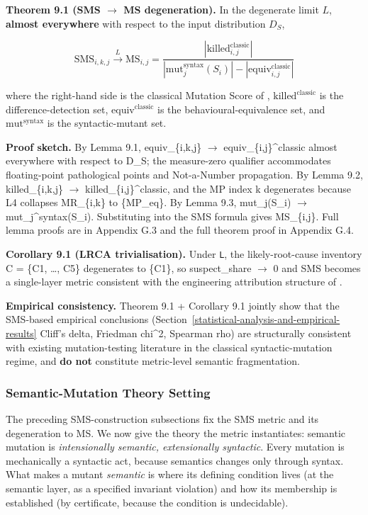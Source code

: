 \documentclass[12pt]{article}
\begin{document}
\textbf{Theorem 9.1 (SMS $\to$ MS degeneration).} In the degenerate limit
$L$, \textbf{almost everywhere} with respect to the input
distribution $D_S$,

\[ \mathrm{SMS}_{i,k,j} \xrightarrow{L} \mathrm{MS}_{i,j} = \frac{|\mathrm{killed}_{i,j}^{\mathrm{classic}}|}{|\mathrm{mut}_j^{\mathrm{syntax}}(S_i)| - |\mathrm{equiv}_{i,j}^{\mathrm{classic}}|} \]

where the right-hand side is the classical Mutation Score of
\citet{d7c38286734419b52de4262c9802ebdfcf4b9447},
$\mathrm{killed}^{\mathrm{classic}}$ is the difference-detection set,
$\mathrm{equiv}^{\mathrm{classic}}$ is the behavioural-equivalence set,
and $\mathrm{mut}^{\mathrm{syntax}}$ is the syntactic-mutant set.

\textbf{Proof sketch.} By Lemma 9.1, equiv\_\{i,k,j\} $\to$
equiv\_\{i,j\}\^{}classic almost everywhere with respect to D\_S; the
measure-zero qualifier accommodates floating-point pathological points
and Not-a-Number propagation. By Lemma 9.2, killed\_\{i,k,j\} $\to$
killed\_\{i,j\}\^{}classic, and the MP index k degenerates because L4
collapses MR\_\{i,k\} to \{MP\_eq\}. By Lemma 9.3, mut\_j(S\_i) $\to$
mut\_j\^{}syntax(S\_i). Substituting into the SMS formula gives
MS\_\{i,j\}. Full lemma proofs are in Appendix G.3 and the full theorem
proof in Appendix G.4.

\textbf{Corollary 9.1 (LRCA trivialisation).} Under \texttt{L}, the
likely-root-cause inventory C = \{C1, \ldots, C5\} degenerates to
\{C1\}, so suspect\_share $\to$ 0 and SMS becomes a single-layer metric
consistent with the engineering attribution structure of
\citet{d7c38286734419b52de4262c9802ebdfcf4b9447}.

\textbf{Empirical consistency.} Theorem 9.1 + Corollary 9.1 jointly
show that the SMS-based empirical conclusions (Section~\ref{statistical-analysis-and-empirical-results} Cliff's delta,
Friedman chi\^{}2, Spearman rho) are structurally consistent with
existing mutation-testing literature in the classical syntactic-mutation
regime, and \textbf{do not} constitute metric-level semantic
fragmentation.


\subsubsection{Semantic-Mutation Theory Setting}\label{theory-setting}

The preceding SMS-construction subsections fix the SMS metric and its degeneration to MS. We now
give the theory the metric instantiates: semantic mutation is
\emph{intensionally semantic, extensionally syntactic}. Every mutation
is mechanically a syntactic act, because semantics changes only through
syntax. What makes a mutant \emph{semantic} is where its defining
condition lives (at the semantic layer, as a specified invariant
violation) and how its membership is established (by certificate,
because the condition is undecidable).
\end{document}
